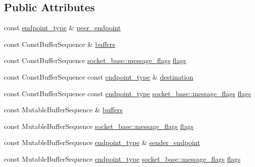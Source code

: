 \subsection*{Public Attributes}
\begin{DoxyCompactItemize}
\item 
const \hyperlink{classasio_1_1raw__socket__service_a8278f352f4e4424d431320f924e8b496}{endpoint\+\_\+type} \& \hyperlink{classasio_1_1raw__socket__service_ad9ddc4af36bf42586989e53bbd880cd5}{peer\+\_\+endpoint}
\item 
const Const\+Buffer\+Sequence \& \hyperlink{classasio_1_1raw__socket__service_a45cf013e3c3889296ee65fd303253db6}{buffers}
\item 
const Const\+Buffer\+Sequence \hyperlink{classasio_1_1socket__base_ac3cf77465dfedfe1979b5415cf32cc94}{socket\+\_\+base\+::message\+\_\+flags} \hyperlink{classasio_1_1raw__socket__service_a735387eb54985dafc0ba5314df84590a}{flags}
\item 
const Const\+Buffer\+Sequence const \hyperlink{classasio_1_1raw__socket__service_a8278f352f4e4424d431320f924e8b496}{endpoint\+\_\+type} \& \hyperlink{classasio_1_1raw__socket__service_a862ad7c956d71979dbe3702d78540643}{destination}
\item 
const Const\+Buffer\+Sequence const \hyperlink{classasio_1_1raw__socket__service_a8278f352f4e4424d431320f924e8b496}{endpoint\+\_\+type} \hyperlink{classasio_1_1socket__base_ac3cf77465dfedfe1979b5415cf32cc94}{socket\+\_\+base\+::message\+\_\+flags} \hyperlink{classasio_1_1raw__socket__service_a168e511287872068dd5009a20d36b8cd}{flags}
\item 
const Mutable\+Buffer\+Sequence \& \hyperlink{classasio_1_1raw__socket__service_aaa3ea28d6710a8dc189c9cea10d362a0}{buffers}
\item 
const Mutable\+Buffer\+Sequence \hyperlink{classasio_1_1socket__base_ac3cf77465dfedfe1979b5415cf32cc94}{socket\+\_\+base\+::message\+\_\+flags} \hyperlink{classasio_1_1raw__socket__service_a4cf894534b8f3ead1207ed06b557bc40}{flags}
\item 
const Mutable\+Buffer\+Sequence \hyperlink{classasio_1_1raw__socket__service_a8278f352f4e4424d431320f924e8b496}{endpoint\+\_\+type} \& \hyperlink{classasio_1_1raw__socket__service_a0b930d4292ec8fdf3e1065f3d033db49}{sender\+\_\+endpoint}
\item 
const Mutable\+Buffer\+Sequence \hyperlink{classasio_1_1raw__socket__service_a8278f352f4e4424d431320f924e8b496}{endpoint\+\_\+type} \hyperlink{classasio_1_1socket__base_ac3cf77465dfedfe1979b5415cf32cc94}{socket\+\_\+base\+::message\+\_\+flags} \hyperlink{classasio_1_1raw__socket__service_a5de9c380dbb3006f2945ee2753c3c268}{flags}
\end{DoxyCompactItemize}
